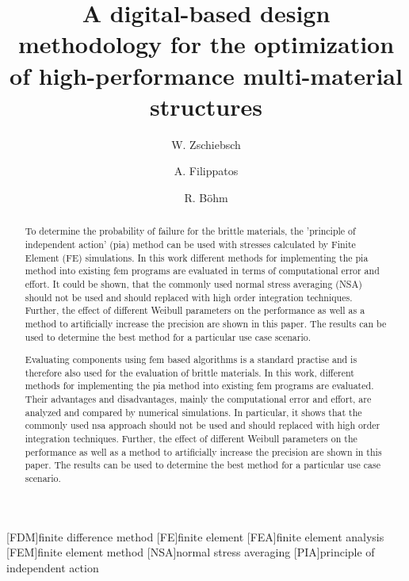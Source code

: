 \documentclass[num-refs,twocolumn]{layout}
\title{A digital-based design methodology for the optimization of high-performance multi-material structures}
\author[1]{W. Zschiebsch}%
\author[2]{A. Filippatos}
\author[1]{R. Böhm}
\affil[1]{Leipzig University of Applied Sciences, Faculty of Engineering, Germany}
\affil[2]{Dresden Center for Intelligent Materials, Germany}
\begin{document}
[FDM]{finite difference method}
[FE]{finite element}
[FEA]{finite element analysis}
[FEM]{finite element method}
[NSA]{normal stress averaging}
[PIA]{principle of independent action}

\begin{frontmatter}
\maketitle

\begin{abstract}
To determine the probability of failure for the brittle materials, the 'principle of independent action' (pia) method can be used with stresses calculated by Finite Element (FE) simulations. In this work different methods for implementing the pia method into existing fem programs are evaluated in terms of computational error and effort. It could be shown, that the commonly used normal stress averaging (NSA) should not be used and should replaced with high order integration techniques. Further, the effect of different Weibull parameters on the performance as well as a method to artificially increase the precision are shown in this paper. The results can be used to determine the best method for a particular use case scenario.

Evaluating components using \ac{fem} based algorithms is a standard practise and is
therefore also used for the evaluation of brittle materials. In this work, different 
methods for implementing the \ac*{pia} method into existing \ac{fem} programs are evaluated. Their advantages and disadvantages, mainly the computational error and effort, are analyzed and compared by numerical simulations. 
In particular, it shows that the commonly used \ac*{nsa} approach should not be used and should replaced with high order integration techniques.
Further, the effect of different Weibull parameters on the performance as well as a method to artificially increase the precision are shown in this paper. The results can be used to determine the best method for a particular use case scenario.
\end{abstract}
\end{frontmatter}

\end{document}
